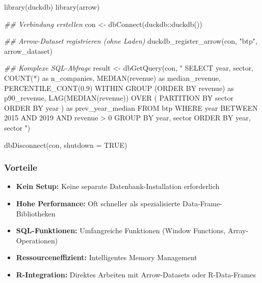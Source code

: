 \documentclass[
  ngerman,
  10pt,
  twocolumn]{article}
\newenvironment{Shaded}{\begin{snugshade}}{\end{snugshade}}
\newcommand{\AttributeTok}[1]{\textcolor[rgb]{0.40,0.45,0.13}{#1}}
\newcommand{\ConstantTok}[1]{\textcolor[rgb]{0.56,0.35,0.01}{#1}}
\newcommand{\DocumentationTok}[1]{\textcolor[rgb]{0.37,0.37,0.37}{\textit{#1}}}
\newcommand{\FunctionTok}[1]{\textcolor[rgb]{0.28,0.35,0.67}{#1}}
\newcommand{\NormalTok}[1]{\textcolor[rgb]{0.00,0.23,0.31}{#1}}
\newcommand{\OtherTok}[1]{\textcolor[rgb]{0.00,0.23,0.31}{#1}}
\newcommand{\SpecialCharTok}[1]{\textcolor[rgb]{0.37,0.37,0.37}{#1}}
\newcommand{\StringTok}[1]{\textcolor[rgb]{0.13,0.47,0.30}{#1}}
\providecommand{\tightlist}{%
  \setlength{\itemsep}{0pt}\setlength{\parskip}{0pt}}
\begin{document}
\begin{Shaded}
\begin{Highlighting}[]
\FunctionTok{library}\NormalTok{(duckdb)}
\FunctionTok{library}\NormalTok{(arrow)}

\DocumentationTok{\#\# Verbindung erstellen}
\NormalTok{con }\OtherTok{\textless{}{-}} \FunctionTok{dbConnect}\NormalTok{(duckdb}\SpecialCharTok{::}\FunctionTok{duckdb}\NormalTok{())}

\DocumentationTok{\#\# Arrow{-}Dataset registrieren (ohne Laden)}
\FunctionTok{duckdb\_register\_arrow}\NormalTok{(con, }\StringTok{"btp"}\NormalTok{, arrow\_dataset)}

\DocumentationTok{\#\# Komplexe SQL{-}Abfrage}
\NormalTok{result }\OtherTok{\textless{}{-}} \FunctionTok{dbGetQuery}\NormalTok{(con, }\StringTok{"}
\StringTok{  SELECT }
\StringTok{    year,}
\StringTok{    sector,}
\StringTok{    COUNT(*) as n\_companies,}
\StringTok{    MEDIAN(revenue) as median\_revenue,}
\StringTok{    PERCENTILE\_CONT(0.9) WITHIN GROUP (ORDER BY revenue) as p90\_revenue,}
\StringTok{    LAG(MEDIAN(revenue)) OVER (}
\StringTok{      PARTITION BY sector }
\StringTok{      ORDER BY year}
\StringTok{    ) as prev\_year\_median}
\StringTok{  FROM btp}
\StringTok{  WHERE year BETWEEN 2015 AND 2019}
\StringTok{    AND revenue \textgreater{} 0}
\StringTok{  GROUP BY year, sector}
\StringTok{  ORDER BY year, sector}
\StringTok{"}\NormalTok{)}

\FunctionTok{dbDisconnect}\NormalTok{(con, }\AttributeTok{shutdown =} \ConstantTok{TRUE}\NormalTok{)}
\end{Highlighting}
\end{Shaded}

\subsubsection{Vorteile}\label{vorteile}

\begin{itemize}
\tightlist
\item
  \textbf{Kein Setup:} Keine separate Datenbank-Installation
  erforderlich
\item
  \textbf{Hohe Performance:} Oft schneller als spezialisierte
  Data-Frame-Bibliotheken
\item
  \textbf{SQL-Funktionen:} Umfangreiche Funktionen (Window Functions,
  Array-Operationen)
\item
  \textbf{Ressourceneffizient:} Intelligentes Memory Management
\item
  \textbf{R-Integration:} Direktes Arbeiten mit Arrow-Datasets oder
  R-Data-Frames
\end{itemize}
\end{document}
